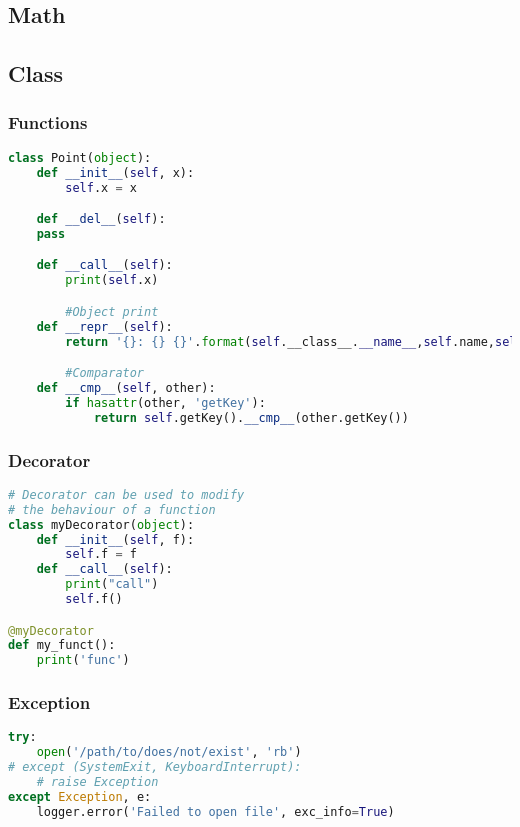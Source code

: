 \subsection{Math}


\subsection{Class}

\subsubsection{Functions}

\lstset{language=Python}
\begin{lstlisting}[language=Python]
class Point(object):
    def __init__(self, x):
        self.x = x

    def __del__(self):
    pass

    def __call__(self):
        print(self.x)

        #Object print
    def __repr__(self):
        return '{}: {} {}'.format(self.__class__.__name__,self.name,self.number)

        #Comparator
    def __cmp__(self, other):
        if hasattr(other, 'getKey'):
            return self.getKey().__cmp__(other.getKey())
\end{lstlisting}

\subsubsection{Decorator}
\begin{lstlisting}[language=Python]
# Decorator can be used to modify
# the behaviour of a function
class myDecorator(object):
    def __init__(self, f):
        self.f = f
    def __call__(self):
        print("call")
        self.f()

@myDecorator
def my_funct():
    print('func')
\end{lstlisting}


\subsubsection{Exception}
\begin{lstlisting}[language=Python]
try:
    open('/path/to/does/not/exist', 'rb')
# except (SystemExit, KeyboardInterrupt):
    # raise Exception
except Exception, e:
    logger.error('Failed to open file', exc_info=True)
\end{lstlisting}


